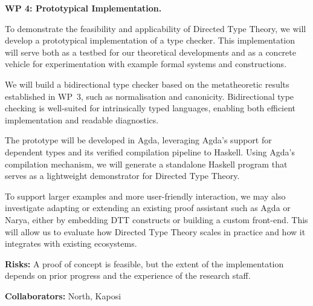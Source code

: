 \documentclass[a4paper,11pt]{article}
\renewcommand{\paragraph}[1]{\textbf{#1.}}
\begin{document}
\paragraph{WP 4: Prototypical Implementation}

To demonstrate the feasibility and applicability of Directed Type
Theory, we will develop a prototypical implementation of a type
checker. This implementation will serve both as a testbed for our
theoretical developments and as a concrete vehicle for experimentation
with example formal systems and constructions.

We will build a bidirectional type checker based on the metatheoretic
results established in WP~3, such as normalisation and
canonicity. Bidirectional type checking is well-suited for
intrinsically typed languages, enabling both efficient implementation
and readable diagnostics.

The prototype will be developed in Agda, leveraging Agda’s support for
dependent types and its verified compilation pipeline to
Haskell. Using Agda's compilation mechanism, we will generate a
standalone Haskell program that serves as a lightweight demonstrator
for Directed Type Theory.

To support larger examples and more user-friendly interaction, we may
also investigate adapting or extending an existing proof assistant
such as Agda or Narya, either by embedding DTT constructs or building
a custom front-end. This will allow us to evaluate how Directed Type
Theory scales in practice and how it integrates with existing
ecosystems.

\textbf{Risks:} A proof of concept is feasible, but the extent of the
implementation depends on prior progress and the experience of the
research staff.

\textbf{Collaborators:} North, Kaposi



\end{document}
